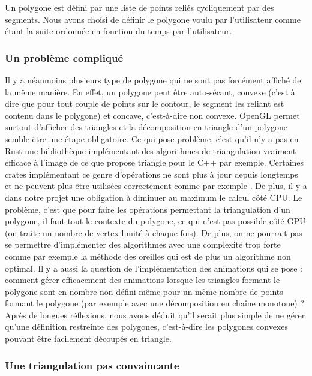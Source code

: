 \documentclass[12pt]{article}
\begin{document}
Un polygone est défini par une liste de points reliés cycliquement par des segments.
Nous avons choisi de définir le polygone voulu par l'utilisateur comme étant la suite
ordonnée en fonction du temps par l'utilisateur.

\subsubsection{Un problème compliqué}

Il y a néanmoins plusieurs type de polygone qui ne sont pas forcément affiché de la même manière.
En effet, un polygone peut être auto-sécant, convexe
(c'est à dire que pour tout couple de points sur le contour, le segment les reliant est contenu dans le polygone) et
concave, c'est-à-dire non convexe.
OpenGL permet surtout d'afficher des triangles et la décomposition en triangle d'un polygone semble être
une étape obligatoire. Ce qui pose problème, c'est qu'il n'y a pas en Rust une bibliothèque implémentant
des algorithmes de triangulation vraiment efficace à l'image de ce que propose triangle \cite{Triangle} pour le
C++ par exemple. Certaines crates implémentant ce genre d'opérations ne sont plus à jour depuis longtemps
et ne peuvent plus être utilisées correctement comme par exemple \cite{rtriangulate}. De plus, il y a dans notre projet
une obligation à diminuer au maximum le calcul côté CPU. Le problème, c'est que pour faire les opérations
permettant la triangulation d'un polygone, il faut tout le contexte du polygone, ce qui n'est pas possible
côté GPU (on traite un nombre de vertex limité à chaque fois). De plus, on ne pourrait pas se permettre
d'implémenter des algorithmes avec une complexité trop forte comme par exemple la méthode des oreilles \cite{earClipping} qui est de plus un algorithme non optimal. Il y a aussi la question de l'implémentation
des animations qui se pose : comment gérer efficacement des animations lorsque les triangles
formant le polygone sont en nombre non défini même pour un même nombre de points formant le polygone
(par exemple avec une décomposition en chaîne monotone) ?
Après de longues réflexions, nous avons déduit qu'il serait plus simple de ne gérer qu'une définition restreinte
des polygones, c'est-à-dire les polygones convexes pouvant être facilement découpés en triangle.

\subsubsection{Une triangulation pas convaincante}
\end{document}
